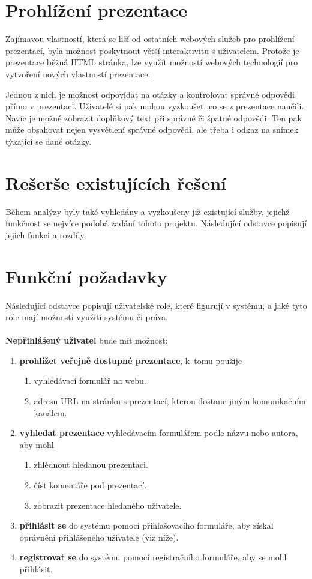 \documentclass[11pt,twoside,a4paper]{book}
\begin{document}
\section{Prohlížení prezentace}
Zajímavou vlastností, která se liší od ostatních webových služeb pro prohlížení prezentací, byla možnost poskytnout větší interaktivitu s uživatelem. Protože je prezentace běžná HTML stránka, lze využít možností webových technologií pro vytvoření nových vlastností prezentace.

Jednou z nich je možnost odpovídat na otázky a kontrolovat správné odpovědi přímo v prezentaci. Uživatelé si pak mohou vyzkoušet, co se z prezentace naučili. Navíc je možné zobrazit doplňkový text při správné či špatné odpovědi. Ten pak může obsahovat nejen vysvětlení správné odpovědi, ale třeba i odkaz na snímek týkající se dané otázky.

\section{Rešerše existujících řešení} \label{chap:existujiciSystemy}
Během analýzy byly také vyhledány a vyzkoušeny již existující služby, jejichž funkčnost se nejvíce podobá zadání tohoto projektu. Následující odstavce popisují jejich funkci a rozdíly.


\section{Funkční požadavky}
Následující odstavce popisují uživatelské role, které figurují v systému, a jaké tyto role mají možnosti využití systému či práva.\\\\

\noindent \textbf{Nepřihlášený uživatel} bude mít možnost:
\begin{enumerate}
	\item \textbf{prohlížet veřejně dostupné prezentace}, k~tomu použije 
		\begin{enumerate}[label*=\arabic*.]
			\item vyhledávací formulář na webu.
			\item adresu URL na stránku s prezentací, kterou dostane jiným komunikačním kanálem.
		\end{enumerate}
	\item \textbf{vyhledat prezentace} vyhledávacím formulářem podle názvu nebo autora, aby mohl
		\begin{enumerate}[label*=\arabic*.]
			\item zhlédnout hledanou prezentaci.
			\item číst komentáře pod prezentací.
			\item zobrazit prezentace hledaného uživatele.
		\end{enumerate}
	\item \textbf{přihlásit se} do systému pomocí přihlašovacího formuláře, aby získal oprávnění přihlášeného uživatele (viz níže).
	\item \textbf{registrovat se} do systému pomocí registračního formuláře, aby se mohl přihlásit.
\end{enumerate}
\end{document}
